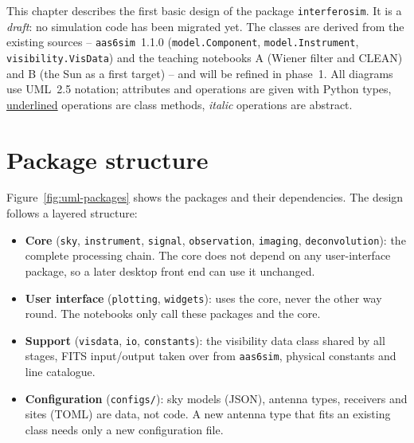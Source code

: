 \label{ch:basic-design}

This chapter describes the first basic design of the package
\texttt{interferosim}. It is a \emph{draft}: no simulation code has been
migrated yet. The classes are derived from the existing sources --
\texttt{aas6sim}~1.1.0 (\texttt{model.Component}, \texttt{model.Instrument},
\texttt{visibility.VisData}) and the teaching notebooks A (Wiener filter
and CLEAN) and B (the Sun as a first target) -- and will be refined in
phase~1. All diagrams use UML~2.5 notation; attributes and operations are
given with Python types, \underline{underlined} operations are class
methods, \textit{italic} operations are abstract.

\section{Package structure}

Figure~\ref{fig:uml-packages} shows the packages and their dependencies.
The design follows a layered structure:

\begin{itemize}
  \item \textbf{Core} (\texttt{sky}, \texttt{instrument}, \texttt{signal},
        \texttt{observation}, \texttt{imaging}, \texttt{deconvolution}):
        the complete processing chain. The core does not depend on any
        user-interface package, so a later desktop front end can use it
        unchanged.
  \item \textbf{User interface} (\texttt{plotting}, \texttt{widgets}):
        uses the core, never the other way round. The notebooks only call
        these packages and the core.
  \item \textbf{Support} (\texttt{visdata}, \texttt{io},
        \texttt{constants}): the visibility data class shared by all
        stages, FITS input/output taken over from \texttt{aas6sim},
        physical constants and line catalogue.
  \item \textbf{Configuration} (\texttt{configs/}): sky models (JSON),
        antenna types, receivers and sites (TOML) are data, not code. A new antenna type that
        fits an existing class needs only a new configuration file.
\end{itemize}

